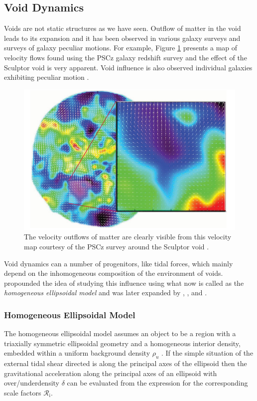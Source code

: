 \documentclass[fleqn,usenatbib]{mnras}
\begin{document}
\subsection{Void Dynamics}
Voids are not static structures as we have seen. Outflow of matter in the void leads to its expansion and it has been observed in various galaxy surveys and surveys of galaxy peculiar motions. For example, Figure \ref{fig:voidflow} presents a map of velocity flows found using the PSCz galaxy redshift survey and the effect of the Sculptor void is very apparent. Void influence is also observed individual galaxies exhibiting peculiar motion \citep{tully_our_2008}.
\begin{figure}
	\centering
	\includegraphics[scale = 0.35]{voidflow}
	\caption{The velocity outflows of matter are clearly visible from this velocity map courtesy of the PSCz survey around the Sculptor void \citep{romano-diaz_delaunay_2007}.}
	\label{fig:voidflow}
\end{figure}
Void dynamics can a number of progenitors, like tidal forces, which mainly depend on the inhomogeneous composition of the environment of voids. \cite{icke_voids_1984} propounded the idea of studying this influence using what now is called as the \textit{homogeneous ellipsoidal model} and was later expanded by \cite{white_growth_1979}, \cite{eisenstein_analytical_1995}, \cite{bond_peak-patch_1996} and \cite{desjacques_environmental_2008}.
\subsubsection{Homogeneous Ellipsoidal Model}
The homogeneous ellipsoidal model assumes an object to be a region with a triaxially symmetric ellipsoidal geometry and a homogeneous interior density, embedded within a uniform background density $ \rho_u $ . If the simple situation of the external tidal shear directed is along the principal axes of the ellipsoid then the gravitational acceleration along the principal axes of an ellipsoid with over/underdensity $ \delta $ can be evaluated from the expression for the corresponding scale factors $ \mathcal{R}_\textrm{i} $.
\end{document}
